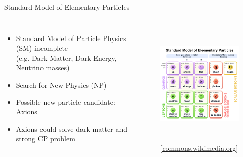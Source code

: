 \documentclass[aspectratio=1610, 9pt]{beamer}
\begin{document}
\begin{frame}{Standard Model of Elementary Particles}
  \begin{columns}
    \centering
    \begin{itemize}
      \item Standard Model of Particle Physics (SM) incomplete \\ (e.g. Dark Matter, Dark Energy, Neutrino masses)
      \item Search for New Physics (NP)
      \item Possible new particle candidate: Axions
      \item Axions could solve dark matter and strong CP problem
    \end{itemize}
    \begin{figure}
    \includegraphics[height=6cm]{images/SM.pdf}
    \caption{\footnotesize \href{https://commons.wikimedia.org/wiki/File:Standard_Model_of_Elementary_Particles.svg}{{[commons.wikimedia.org]}}}
    \end{figure}
  \end{columns} 
\end{frame}
\end{document}
